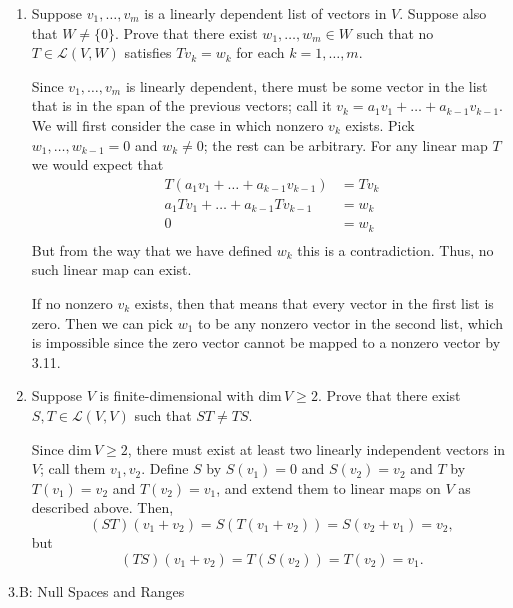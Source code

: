 \documentclass{book}
\begin{document}
\begin{enumerate}
\item Suppose \(v_1,\dots,v_m\) is a linearly dependent list of vectors in \(V\).  Suppose also that \(W \neq \{0\}\).  Prove that there exist \(w_1,\dots,w_m \in W\) such that no \(T \in \mathcal{L}(V,W)\) satisfies \(Tv_k=w_k\) for each \(k=1,\dots,m\).

Since \(v_1,\dots,v_m\) is linearly dependent, there must be some vector in the list that is in the span of the previous vectors; call it \(v_k=a_1v_1+\dots+a_{k-1}v_{k-1}\).  We will first consider the case in which nonzero \(v_k\) exists.  Pick \(w_1,\dots,w_{k-1}=0\) and \(w_k \neq 0\); the rest can be arbitrary.  For any linear map \(T\) we would expect that 
\begin{equation*}
\begin{split}
T(a_1v_1+\dots+a_{k-1}v_{k-1}) &= Tv_k \\
a_1Tv_1+\dots+a_{k-1}Tv_{k-1} &= w_k \\
0 &= w_k \\
\end{split}
\end{equation*}
But from the way that we have defined \(w_k\) this is a contradiction.  Thus, no such linear map can exist.

If no nonzero \(v_k\) exists, then that means that every vector in the first list is zero.  Then we can pick \(w_1\) to be any nonzero vector in the second list, which is impossible since the zero vector cannot be mapped to a nonzero vector by 3.11.

\item Suppose \(V\) is finite-dimensional with \(\textrm{dim} \, V \geq 2\).  Prove that there exist \(S,T \in \mathcal{L}(V,V)\) such that \(ST \neq TS\).

Since \(\textrm{dim} \, V \geq 2\), there must exist at least two linearly independent vectors in \(V\); call them \(v_1,v_2\).  Define \(S\) by \(S(v_1)=0\) and \(S(v_2)=v_2\) and \(T\) by \(T(v_1)=v_2\) and \(T(v_2)=v_1\), and extend them to linear maps on \(V\) as described above.  Then, \[(ST)(v_1+v_2)=S(T(v_1+v_2))=S(v_2+v_1)=v_2,\] but \[(TS)(v_1+v_2)=T(S(v_2))=T(v_2)=v_1.\]

\end{enumerate}

3.B: Null Spaces and Ranges
\end{document}
